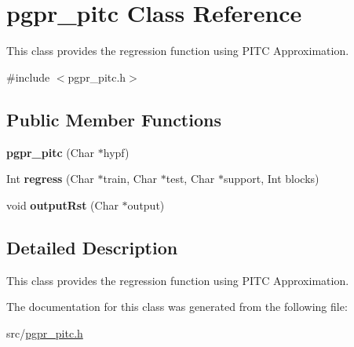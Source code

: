 \hypertarget{classpgpr__pitc}{\section{pgpr\+\_\+pitc Class Reference}
\label{classpgpr__pitc}
}


This class provides the regression function using P\+I\+T\+C Approximation.  




{\ttfamily \#include $<$pgpr\+\_\+pitc.\+h$>$}

\subsection*{Public Member Functions}
\begin{DoxyCompactItemize}
\item 
\hypertarget{classpgpr__pitc_a2601b1c97c337732619818b5812e9f08}{{\bfseries pgpr\+\_\+pitc} (Char $\ast$hypf)}\label{classpgpr__pitc_a2601b1c97c337732619818b5812e9f08}

\item 
\hypertarget{classpgpr__pitc_a9e6d568ecb48f4faa4d3bf0623d2be95}{Int {\bfseries regress} (Char $\ast$train, Char $\ast$test, Char $\ast$support, Int blocks)}\label{classpgpr__pitc_a9e6d568ecb48f4faa4d3bf0623d2be95}

\item 
\hypertarget{classpgpr__pitc_a47b39b307c1a0a22cf260dbbc683d0f2}{void {\bfseries output\+Rst} (Char $\ast$output)}\label{classpgpr__pitc_a47b39b307c1a0a22cf260dbbc683d0f2}

\end{DoxyCompactItemize}


\subsection{Detailed Description}
This class provides the regression function using P\+I\+T\+C Approximation. 

The documentation for this class was generated from the following file\+:\begin{DoxyCompactItemize}
\item 
src/\hyperlink{pgpr__pitc_8h}{pgpr\+\_\+pitc.\+h}\end{DoxyCompactItemize}
